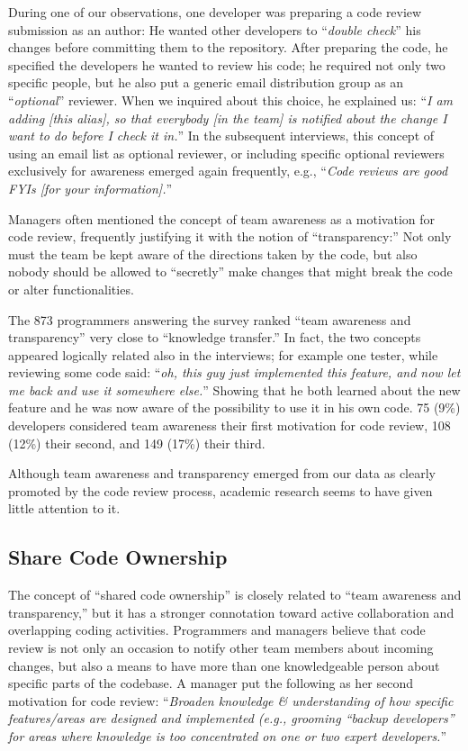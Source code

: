 \documentclass[conference]{IEEEtran}
\renewcommand{\quotation}[1]{``\emph{#1}''}
\begin{document}
During one of our observations, one developer was preparing a code review
submission as an author: He wanted other developers to \quotation{double check}
his changes before committing them to the repository. After preparing the code,
he specified the developers he wanted to review his code; he required not only
two specific people, but he also put a generic email distribution group as an
\quotation{optional} reviewer. When we inquired about this choice, he explained
us: \quotation{I am adding [this alias], so that everybody [in the team] is
notified about the change I want to do before I check it in.} In the subsequent
interviews, this concept of using an email list as optional reviewer, or
including specific optional reviewers exclusively for awareness emerged again
frequently, e.g., \quotation{Code reviews are good FYIs [for your
information].}

Managers often mentioned the concept of team awareness as a motivation for code
review, frequently justifying it with the notion of ``transparency:'' Not only
must the team be kept aware of the directions taken by the code, but also
nobody should be allowed to ``secretly'' make changes that might break the code
or alter functionalities.

The 873 programmers answering the survey ranked ``team awareness and
transparency'' very close to ``knowledge transfer.'' In fact, the two concepts
appeared logically related also in the interviews; for example one tester,
while reviewing some code said: \quotation{oh, this guy just implemented this
feature, and now let me back and use it somewhere else.} Showing that he both
learned about the new feature and he was now aware of the possibility to use it
in his own code. 75 (9\%) developers considered team awareness their first
motivation for code review, 108 (12\%) their second, and 149 (17\%) their
third. 

Although team awareness and transparency emerged from our data as clearly
promoted by the code review process, academic research seems to have given
little attention to it. 

\subsection{Share Code Ownership}

The concept of ``shared code ownership'' is closely related to ``team awareness
and transparency,'' but it has a stronger connotation toward active
collaboration and overlapping coding activities. Programmers and managers
believe that code review is not only an occasion to notify other team members
about incoming changes, but also a means to have more than one knowledgeable
person about specific parts of the codebase. A manager put the following as her
second motivation for code review: \quotation{Broaden knowledge \& understanding
of how specific features/areas are designed and implemented (e.g., grooming
``backup developers'' for areas where knowledge is too concentrated on one or
two expert developers.}
\end{document}
